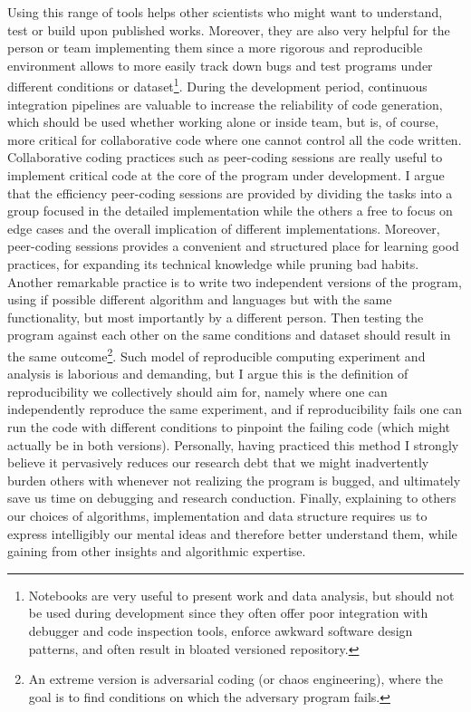 Using this range of tools helps other scientists who might want to understand, test or build upon published works.
Moreover, they are also very helpful for the person or team implementing them since a more rigorous and reproducible environment allows to more easily track down bugs and test programs under different conditions or dataset\footnote{Notebooks are very useful to present work and data analysis, but should not be used during development since they often offer poor integration with debugger and code inspection tools, enforce awkward software design patterns, and often result in bloated versioned repository.}.
During the development period, continuous integration pipelines are valuable to increase the reliability of code generation, which should be used whether working alone or inside team, but is, of course, more critical for collaborative code where one cannot control all the code written.
Collaborative coding practices such as peer-coding sessions are really useful to implement critical code at the core of the program under development.
I argue that the efficiency peer-coding sessions are provided by dividing the tasks into a group focused in the detailed implementation while the others a free to focus on edge cases and the overall implication of different implementations.
Moreover, peer-coding sessions provides a convenient and structured place for learning good practices, for expanding its technical knowledge while pruning bad habits.
Another remarkable practice is to write two independent versions of the program, using if possible different algorithm and languages but with the same functionality, but most importantly by a different person.
Then testing the program against each other on the same conditions and dataset should result in the same outcome\footnote{An extreme version is adversarial coding (or chaos engineering), where the goal is to find conditions on which the adversary program fails.}.
Such model of reproducible computing experiment and analysis is laborious and demanding, but I argue this is the definition of reproducibility we collectively should aim for, namely where one can independently reproduce the same experiment, and if reproducibility fails one can run the code with different conditions to pinpoint the failing code (which might actually be in both versions).
Personally, having practiced this method I strongly believe it pervasively reduces our research debt that we might inadvertently burden others with whenever not realizing the program is bugged, and ultimately save us time on debugging and research conduction.
Finally, explaining to others our choices of algorithms, implementation and data structure requires us to express intelligibly our mental ideas and therefore better understand them, while gaining from other insights and algorithmic expertise.


